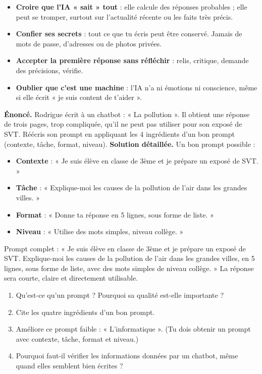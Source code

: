 \documentclass[11pt]{article}
\begin{document}
\begin{attention}
\begin{itemize}
\item \textbf{Croire que l'IA « sait » tout} : elle calcule des réponses probables ; elle peut se tromper, surtout sur l'actualité récente ou les faits très précis.
\item \textbf{Confier ses secrets} : tout ce que tu écris peut être conservé. Jamais de mots de passe, d'adresses ou de photos privées.
\item \textbf{Accepter la première réponse sans réfléchir} : relis, critique, demande des précisions, vérifie.
\item \textbf{Oublier que c'est une machine} : l'IA n'a ni émotions ni conscience, même si elle écrit « je suis content de t'aider ».
\end{itemize}
\end{attention}

\begin{exoresolu}
\textbf{Énoncé.} Rodrigue écrit à un chatbot : « La pollution ». Il obtient une réponse de trois pages, trop compliquée, qu'il ne peut pas utiliser pour son exposé de SVT. Réécris son prompt en appliquant les 4 ingrédients d'un bon prompt (contexte, tâche, format, niveau).
\tcblower
\textbf{Solution détaillée.} Un bon prompt possible :
\begin{itemize}
\item \textbf{Contexte} : « Je suis élève en classe de 3ème et je prépare un exposé de SVT. »
\item \textbf{Tâche} : « Explique-moi les causes de la pollution de l'air dans les grandes villes. »
\item \textbf{Format} : « Donne ta réponse en 5 lignes, sous forme de liste. »
\item \textbf{Niveau} : « Utilise des mots simples, niveau collège. »
\end{itemize}
Prompt complet : « Je suis élève en classe de 3ème et je prépare un exposé de SVT. Explique-moi les causes de la pollution de l'air dans les grandes villes, en 5 lignes, sous forme de liste, avec des mots simples de niveau collège. » La réponse sera courte, claire et directement utilisable.
\end{exoresolu}

\begin{exercice}
\begin{enumerate}
\item Qu'est-ce qu'un prompt ? Pourquoi sa qualité est-elle importante ?
\item Cite les quatre ingrédients d'un bon prompt.
\item Améliore ce prompt faible : « L'informatique ». (Tu dois obtenir un prompt avec contexte, tâche, format et niveau.)
\item Pourquoi faut-il vérifier les informations données par un chatbot, même quand elles semblent bien écrites ?
\end{enumerate}
\end{exercice}
\end{document}
